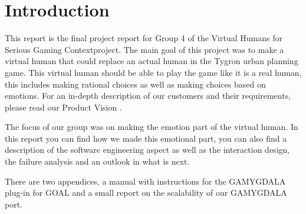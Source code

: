 \section{Introduction}
This report is the final project report for Group 4 of the Virtual Humans for Serious Gaming Contextproject. The main goal of this project was to make a virtual human that could replace an actual human in the Tygron \citep{tygron} urban planning game. This virtual human should be able to play the game like it is a real human, this includes making rational choices as well as making choices based on emotions. For an in-depth description of our customers and their requirements, please read our Product Vision \citep{vision}. \\ \par
The focus of our group was on making the emotion part of the virtual human. In this report you can find how we made this emotional part, you can also find a description of the software engineering aspect as well as the interaction design, the failure analysis and an outlook in what is next. \par
There are two appendices, a manual with instructions for the GAMYGDALA plug-in for GOAL and a small report on the scalability of our GAMYGDALA port.